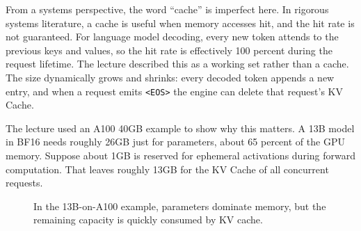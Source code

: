 \documentclass[twoside]{article}
\newcommand{\EOS}{\texttt{<EOS>}}
\begin{document}
From a systems perspective, the word ``cache'' is imperfect here.  In rigorous systems literature, a cache is useful when memory accesses hit, and the hit rate is not guaranteed.  For language model decoding, every new token attends to the previous keys and values, so the hit rate is effectively 100 percent during the request lifetime.  The lecture described this as a working set rather than a cache.  The size dynamically grows and shrinks: every decoded token appends a new entry, and when a request emits \EOS{} the engine can delete that request's KV Cache.

The lecture used an A100 40GB example to show why this matters.  A 13B model in BF16 needs roughly 26GB just for parameters, about 65 percent of the GPU memory.  Suppose about 1GB is reserved for ephemeral activations during forward computation.  That leaves roughly 13GB for the KV Cache of all concurrent requests.

\begin{figure}[H]
\centering
{}
\caption{In the 13B-on-A100 example, parameters dominate memory, but the remaining capacity is quickly consumed by KV cache.}
\label{fig:kv-memory}
\end{figure}
\end{document}
